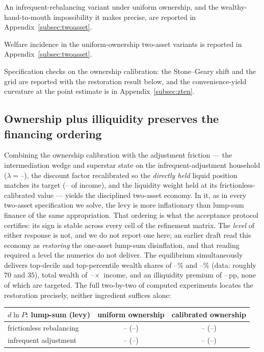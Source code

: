 \documentclass[12pt]{article}
\providecommand{\pendingnum}{\textit{--}}
\providecommand{\TwoADlnPLS}{\pendingnum}\providecommand{\TwoADlnPLevy}{\pendingnum}
\providecommand{\TwoBDlnPLS}{\pendingnum}\providecommand{\TwoBDlnPLevy}{\pendingnum}
\providecommand{\OwnKVLam}{\pendingnum}\providecommand{\OwnKVSb}{\pendingnum}
\providecommand{\OwnKVTopTen}{\pendingnum}\providecommand{\OwnKVTopOne}{\pendingnum}
\providecommand{\OwnKVW}{\pendingnum}\providecommand{\OwnKVPrem}{\pendingnum}
\providecommand{\OwnKVDlnPLS}{\pendingnum}\providecommand{\OwnKVDlnPLevy}{\pendingnum}
\providecommand{\OwnDlnPLS}{\pendingnum}
\providecommand{\OwnDlnPLevy}{\pendingnum}
\begin{document}
An infrequent-rebalancing variant under uniform ownership, and the wealthy-hand-to-mouth impossibility it makes precise, are reported in Appendix~\ref{subsec:twoasset}.

Welfare incidence in the uniform-ownership two-asset variants is reported in Appendix~\ref{subsec:twoasset}.

Specification checks on the ownership calibration: the Stone--Geary shift and the grid are reported with the restoration result below, and the convenience-yield curvature at the \citeauthor{krishnamurthy2012} point estimate is in Appendix~\ref{subsec:zten}.

\subsection{Ownership plus illiquidity preserves the financing ordering}
\noindent
Combining the ownership calibration with the adjustment friction --- the
intermediation wedge and superstar state on the infrequent-adjustment
household ($\lambda=\OwnKVLam$), the discount factor recalibrated so the
\emph{directly held} liquid position matches its target ($\OwnKVSb$ of
income), and the liquidity weight held at its frictionless-calibrated
value --- yields the disciplined two-asset economy. In it, as in every
two-asset specification we solve, the levy is more inflationary than
lump-sum finance of the same appropriation. That ordering is what the
acceptance protocol certifies: its sign is stable across every cell of
the refinement matrix. The \emph{level} of either response is not, and we
do not report one here; an earlier draft read this economy as
\emph{restoring} the one-asset lump-sum disinflation, and that reading
required a level the numerics do not deliver. The
equilibrium simultaneously delivers top-decile and top-percentile wealth
shares of $\OwnKVTopTen\%$ and $\OwnKVTopOne\%$ (data: roughly $70$ and
$35$), total wealth of $\OwnKVW\times$ income, and an illiquidity premium
of $\OwnKVPrem$\,pp, none of which are targeted. The full
two-by-two of computed experiments locates the restoration precisely, neither ingredient suffices alone:
\begin{center}
\begin{tabular}{lcc}
\toprule
$d\ln P$: lump-sum (levy) & uniform ownership & calibrated ownership \\
\midrule
frictionless rebalancing & $\TwoADlnPLS$ ($\TwoADlnPLevy$) & $\OwnDlnPLS$ ($\OwnDlnPLevy$) \\
infrequent adjustment    & $\TwoBDlnPLS$ ($\TwoBDlnPLevy$) & $\OwnKVDlnPLS$ ($\OwnKVDlnPLevy$) \\
\bottomrule
\end{tabular}
\end{center}
\end{document}
